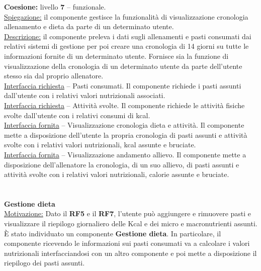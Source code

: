 \documentclass{article}
\begin{document}
      \textbf{Coesione:} livello \textbf{7} – funzionale.\\

      \underline{Spiegazione:} il componente gestisce la funzionalità di visualizzazione cronologia allenamento e dieta da parte di un determinato utente.\\

      \underline{Descrizione:} il componente preleva i dati sugli allenamenti e pasti consumati dai relativi sistemi di gestione per poi creare una cronologia di 14 giorni su tutte
      le informazioni fornite di un determinato utente. Fornisce sia la funzione di visualizzazione della cronologia di un determinato utente da parte dell’utente stesso sia dal
      proprio allenatore.\\

      \underline{Interfaccia richiesta} – Pasti consumati. Il componente richiede i pasti assunti dall’utente con i relativi valori nutrizionali associati.\\

      \underline{Interfaccia richiesta} – Attività svolte. Il componente richiede le attività fisiche svolte dall’utente con i relativi consumi di kcal.\\

      \underline{Interfaccia fornita} – Visualizzazione cronologia dieta e attività. Il componente mette a disposizione dell’utente la propria cronologia di pasti assunti e attività
      svolte con i relativi valori nutrizionali, kcal assunte e bruciate.\\

      \underline{Interfaccia fornita} – Visualizzazione andamento allievo. Il componente mette a disposizione dell’allenatore la cronologia, di un suo allievo, di pasti assunti e
      attività svolte con i relativi valori nutrizionali, calorie assunte e bruciate.\\
      \\
      \\


      {\Large\textbf{Gestione dieta}}\\

      \underline{Motivazione:} Dato il \textbf{RF5} e il \textbf{RF7}, l’utente può aggiungere e rimuovere pasti e visualizzare il riepilogo giornaliero delle Kcal e dei micro e macronutrienti assunti.
      È stato individuato un componente \textbf{Gestione dieta}. In particolare, il componente ricevendo le informazioni sui pasti consumati va a calcolare i valori nutrizionali
      interfacciandosi con un altro componente e poi mette a disposizione il riepilogo dei pasti assunti.\\
\end{document}
